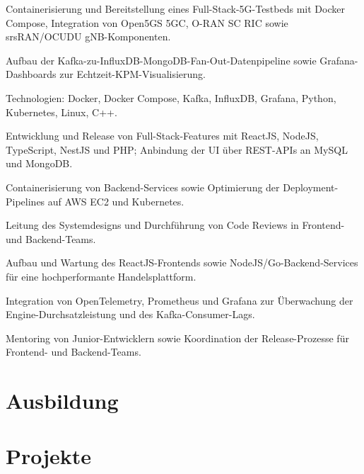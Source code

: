 \documentclass[10pt,a4paper]{resume}
\begin{document}
\bullets
  \item Containerisierung und Bereitstellung eines Full-Stack-5G-Testbeds mit Docker Compose, Integration von Open5GS 5GC, O-RAN SC RIC sowie srsRAN/OCUDU gNB-Komponenten.
  \item Aufbau der Kafka-zu-InfluxDB-MongoDB-Fan-Out-Datenpipeline sowie Grafana-Dashboards zur Echtzeit-KPM-Visualisierung.
  \item Technologien: Docker, Docker Compose, Kafka, InfluxDB, Grafana, Python, Kubernetes, Linux, C++.
\bulletsend
\vspace{1.5pt}
\bullets
  \item Entwicklung und Release von Full-Stack-Features mit ReactJS, NodeJS, TypeScript, NestJS und PHP; Anbindung der UI über REST-APIs an MySQL und MongoDB.
  \item Containerisierung von Backend-Services sowie Optimierung der Deployment-Pipelines auf AWS EC2 und Kubernetes.
  \item Leitung des Systemdesigns und Durchführung von Code Reviews in Frontend- und Backend-Teams.
\bulletsend
\vspace{1.5pt}
\bullets
  \item Aufbau und Wartung des ReactJS-Frontends sowie NodeJS/Go-Backend-Services für eine hochperformante Handelsplattform.
  \item Integration von OpenTelemetry, Prometheus und Grafana zur Überwachung der Engine-Durchsatzleistung und des Kafka-Consumer-Lags.
  \item Mentoring von Junior-Entwicklern sowie Koordination der Release-Prozesse für Frontend- und Backend-Teams.
\bulletsend
\vspace{1.5pt}

\section{Ausbildung}

\vspace{2pt}

\section{Projekte}
\end{document}
